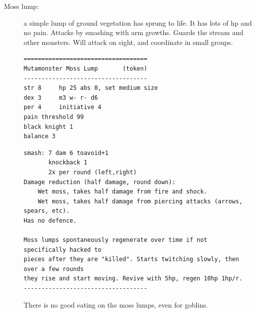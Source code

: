 \begin{description}
\item[Moss lump:] a simple lump of ground vegetation has sprung to life. It has lots of hp and no pain. Attacks by smashing with arm growths. Guards the stream and other monsters. Will attack on sight, and coordinate in small groups.
\goodbreak \small \begin{samepage} \begin{verbatim}
===================================
Mutamonster Moss Lump       (token)
-----------------------------------
str 8     hp 25 abs 0, set medium size
dex 3     m3 w- r- d6
per 4     initiative 4
pain threshold 99
black knight 1
balance 3
\end{verbatim} \end{samepage} \goodbreak \begin{samepage} \begin{verbatim}
smash: 7 dam 6 toavoid+1
       knockback 1
       2x per round (left,right)
Damage reduction (half damage, round down):
    Wet moss, takes half damage from fire and shock.
    Wet moss, takes half damage from piercing attacks (arrows, spears, etc).
Has no defence.

Moss lumps spontaneously regenerate over time if not specifically hacked to
pieces after they are "killed". Starts twitching slowly, then over a few rounds
they rise and start moving. Revive with 5hp, regen 10hp 1hp/r.
-----------------------------------
\end{verbatim} \end{samepage} \normalsize 
There is no good eating on the moss lumps, even for goblins.



\end{description}
